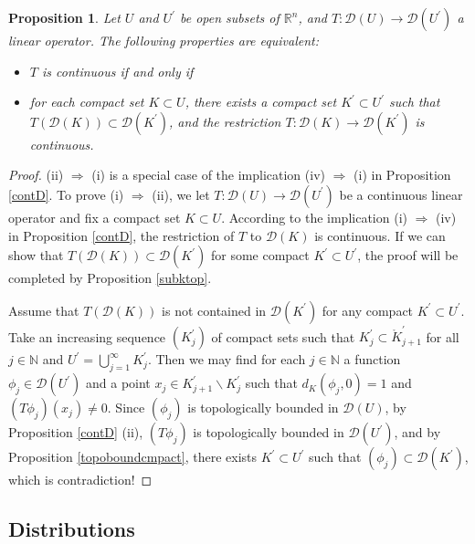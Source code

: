 \documentclass{article}
\numberwithin{equation}{section}
\newcommand{\bbN}{\mathbb{N}}
\newcommand{\bbR}{\mathbb{R}}
\renewcommand{\cal}{\mathcal}
\theoremstyle{plain}
\newtheorem{proposition}[theorem]{Proposition}
\theoremstyle{definition}
\begin{document}
\begin{proposition}
Let $U$ and $U^\prime$ be open subsets of $\bbR^n$, and $T:\cal{D}(U)\to\cal{D}(U^\prime)$ a linear operator. The following properties are equivalent: 
\begin{itemize}
	\item[(i)] $T$ is continuous if and only if 
	\item[(ii)] for each compact set $K\subset U$, there exists a compact set $K^\prime\subset U^\prime$ such that $T(\cal{D}(K))\subset\cal{D}(K^\prime)$, and the restriction $T:\cal{D}(K)\to\cal{D}(K^\prime)$ is continuous.
\end{itemize}
\end{proposition}
\begin{proof}
(ii) $\Rightarrow$ (i) is a special case of the implication (iv) $\Rightarrow$ (i) in Proposition \ref{contD}. To prove (i) $\Rightarrow$ (ii), we let $T:\cal{D}(U)\to\cal{D}(U^\prime)$ be a continuous linear operator and fix a compact set $K\subset U$. According to the implication (i) $\Rightarrow$ (iv) in Proposition \ref{contD}, the restriction of $T$ to $\cal{D}(K)$ is continuous. If we can show that $T(\cal{D}(K))\subset\cal{D}(K^\prime)$ for some compact $K^\prime\subset U^\prime$, the proof will be completed by Proposition \ref{subktop}.

Assume that $T(\cal{D}(K))$ is not contained in $\cal{D}(K^\prime)$ for any compact $K^\prime\subset U^\prime$. Take an increasing sequence $(K_j^\prime)$ of compact sets such that $K_j^\prime\subset\mathring{K}_{j+1}^\prime$ for all $j\in\bbN$ and $U^\prime=\bigcup_{j=1}^\infty K_j^\prime$. Then we may find for each $j\in\bbN$ a function $\phi_j\in\cal{D}(U^\prime)$ and a point $x_j\in K_{j+1}^\prime\backslash K_j^\prime$ such that $d_K(\phi_j,0)=1$ and $(T\phi_j)(x_j)\neq 0$. Since $(\phi_j)$ is topologically bounded in $\cal{D}(U)$, by Proposition \ref{contD} (ii), $(T\phi_j)$ is topologically bounded in $\cal{D}(U^\prime)$, and by Proposition \ref{topoboundcmpact}, there exists $K^\prime\subset U^\prime$ such that $(\phi_j)\subset\cal{D}(K^\prime)$, which is contradiction!
\end{proof}

\newpage
\subsection{Distributions}
\end{document}
